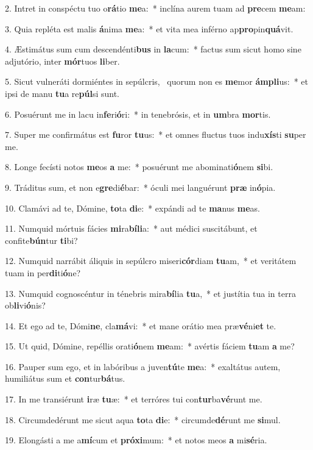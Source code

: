 2. Intret in conspéctu tuo o\textbf{rá}tio \textbf{me}a:~*  inclína aurem tuam ad \textbf{pre}cem \textbf{me}am:\

3. Quia repléta est malis \textbf{á}nima \textbf{me}a:~*  et vita mea inférno ap\textbf{pro}pin\textbf{quá}vit.\

4. Æstimátus sum cum descendénti\textbf{bus} in \textbf{la}cum:~*  factus sum sicut homo sine adjutório, inter \textbf{mór}tuos \textbf{li}ber.\

5. Sicut vulneráti dormiéntes in sepúlcris, \dag\  quorum non es \textbf{me}mor \textbf{ám}\textbf{pli}us:~*  et ipsi de manu \textbf{tu}a re\textbf{púl}si sunt.\

6. Posuérunt me in lacu in\textbf{fe}ri\textbf{ó}ri:~*  in tenebrósis, et in \textbf{um}bra \textbf{mor}tis.\

7. Super me confirmátus est \textbf{fu}ror \textbf{tu}us:~*  et omnes fluctus tuos indu\textbf{xís}ti \textbf{su}per me.\

8. Longe fecísti notos \textbf{me}os \textbf{a} me:~*  posuérunt me abominati\textbf{ó}nem \textbf{si}bi.\

9. Tráditus sum, et non e\textbf{gre}di\textbf{é}bar:~*  óculi mei languérunt \textbf{præ} in\textbf{ó}pia.\

10. Clamávi ad te, Dómine, \textbf{to}ta \textbf{di}e:~*  expándi ad te \textbf{ma}nus \textbf{me}as.\

11. Numquid mórtuis fácies \textbf{mi}ra\textbf{bí}\textbf{li}a:~*  aut médici suscitábunt, et confite\textbf{bún}tur \textbf{ti}bi?\

12. Numquid narrábit áliquis in sepúlcro miseri\textbf{cór}diam \textbf{tu}am,~*  et veritátem tuam in per\textbf{di}ti\textbf{ó}ne?\

13. Numquid cognoscéntur in ténebris mira\textbf{bí}lia \textbf{tu}a,~*  et justítia tua in terra ob\textbf{li}vi\textbf{ó}nis?\

14. Et ego ad te, Dómi\textbf{ne}, cla\textbf{má}vi:~*  et mane orátio mea præ\textbf{vé}ni\textbf{et} te.\

15. Ut quid, Dómine, repéllis orati\textbf{ó}nem \textbf{me}am:~*  avértis fáciem \textbf{tu}am \textbf{a} me?\

16. Pauper sum ego, et in labóribus a juven\textbf{tú}te \textbf{me}a:~*  exaltátus autem, humiliátus sum et \textbf{con}tur\textbf{bá}tus.\

17. In me transiérunt \textbf{i}ræ \textbf{tu}æ:~*  et terróres tui con\textbf{tur}ba\textbf{vé}runt me.\

18. Circumdedérunt me sicut aqua \textbf{to}ta \textbf{di}e:~*  circumde\textbf{dé}runt me \textbf{si}mul.\

19. Elongásti a me a\textbf{mí}cum et \textbf{pró}\textbf{xi}mum:~*  et notos meos \textbf{a} mi\textbf{sé}ria.\

